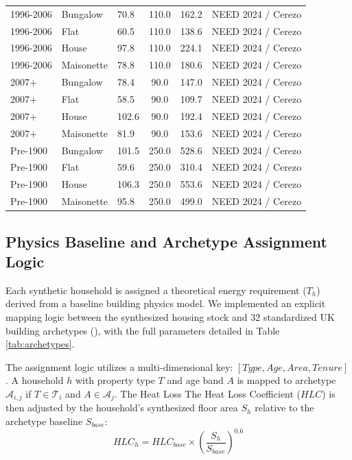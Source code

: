 \documentclass[11pt, a4paper, twocolumn]{article}
\begin{document}
\begin{table}[t]
\begin{tabular}{lllccl}
1996-2006 & Bungalow & 70.8 & 110.0 & 162.2 & NEED 2024 / Cerezo \\
1996-2006 & Flat & 60.5 & 110.0 & 138.6 & NEED 2024 / Cerezo \\
1996-2006 & House & 97.8 & 110.0 & 224.1 & NEED 2024 / Cerezo \\
1996-2006 & Maisonette & 78.8 & 110.0 & 180.6 & NEED 2024 / Cerezo \\
2007+ & Bungalow & 78.4 & 90.0 & 147.0 & NEED 2024 / Cerezo \\
2007+ & Flat & 58.5 & 90.0 & 109.7 & NEED 2024 / Cerezo \\
2007+ & House & 102.6 & 90.0 & 192.4 & NEED 2024 / Cerezo \\
2007+ & Maisonette & 81.9 & 90.0 & 153.6 & NEED 2024 / Cerezo \\
Pre-1900 & Bungalow & 101.5 & 250.0 & 528.6 & NEED 2024 / Cerezo \\
Pre-1900 & Flat & 59.6 & 250.0 & 310.4 & NEED 2024 / Cerezo \\
Pre-1900 & House & 106.3 & 250.0 & 553.6 & NEED 2024 / Cerezo \\
Pre-1900 & Maisonette & 95.8 & 250.0 & 499.0 & NEED 2024 / Cerezo \\
\bottomrule
\end{tabular}
\end{table}

\subsection{Physics Baseline and Archetype Assignment
Logic}\label{physics-baseline-and-archetype-assignment-logic}

Each synthetic household is assigned a theoretical energy requirement
(\(T_h\)) derived from a baseline building physics model. We implemented
an explicit mapping logic between the synthesized housing stock and 32
standardized UK building archetypes (\cite{Cerezo2017}), with the full parameters 
detailed in Table \ref{tab:archetypes}.

The assignment logic utilizes a multi-dimensional key:
\([Type, Age, Area, Tenure]\). A household \(h\) with property type
\(T\) and age band \(A\) is mapped to archetype \(\mathcal{A}_{i,j}\) if
\(T \in \mathcal{T}_i\) and \(A \in \mathcal{A}_j\). The Heat Loss
The Heat Loss Coefficient (\(HLC\)) is then adjusted by the household's synthesized
floor area \(S_h\) relative to the archetype baseline \(S_{base}\):
\begin{equation}
HLC_h = HLC_{base} \times \left(\frac{S_h}{S_{base}}\right)^{0.6}
\end{equation}
\end{document}

